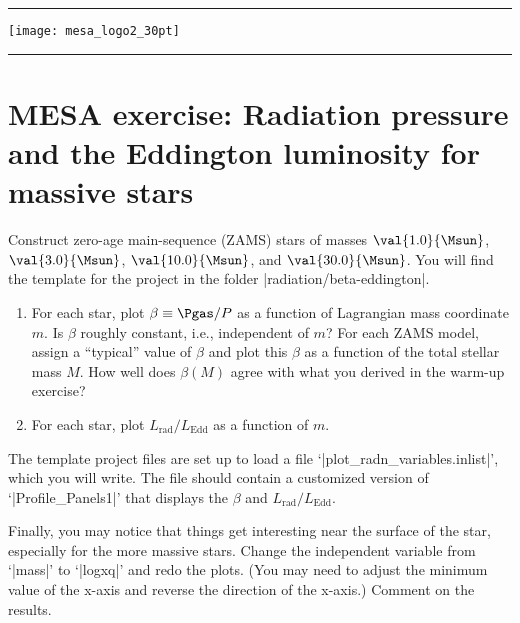 
\DefineShortVerb{\|}

\newpage

\begin{center}
\rule[10pt]{60pt}{1pt}\texttt{[image: mesa\_logo2\_30pt]}\rule[10pt]{60pt}{1pt}
\end{center}

\section{MESA exercise: Radiation pressure and the Eddington luminosity for massive stars}

Construct zero-age main-sequence (ZAMS) stars of masses $\val{1.0}{\Msun}$, $\val{3.0}{\Msun}$, $\val{10.0}{\Msun}$, and $\val{30.0}{\Msun}$. You will find the template for the project in  the folder |radiation/beta-eddington|. 

\begin{enumerate}
\item For each star, plot $\beta\equiv \Pgas/P$ as a function of Lagrangian mass coordinate $m$. Is $\beta$ roughly constant, i.e., independent of $m$? For each ZAMS model, assign a ``typical'' value of $\beta$ and plot this $\beta$ as a function of the total stellar mass $M$.  How well does $\beta(M)$ agree with what you derived in the warm-up exercise?

\item For each star, plot $L_{\mathrm{rad}}/L_{\mathrm{Edd}}$ as a function of $m$.
\end{enumerate}
The template project files are set up to load a file `|plot_radn_variables.inlist|', which you will write.  The file should contain a customized version of `|Profile_Panels1|' that displays the $\beta$ and $L_{\mathrm{rad}}/L_{\mathrm{Edd}}$.

Finally, you may notice that things get interesting near the surface of the star, especially for the more massive stars.  Change the independent variable from `|mass|' to `|logxq|' and redo the plots. (You may need to adjust the minimum value of the x-axis and reverse the direction of the x-axis.) Comment on the results.

\UndefineShortVerb{\|}
